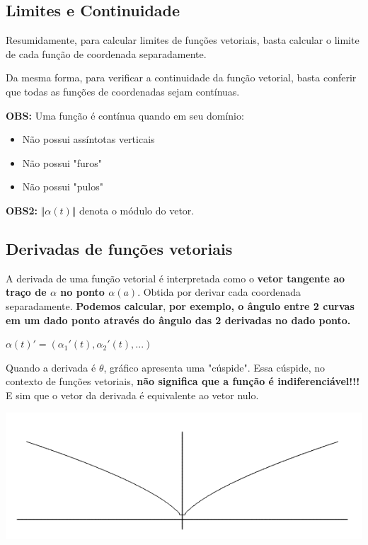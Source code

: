 \documentclass[letterpaper, 11pt]{article}
\begin{document}
\subsection{Limites e Continuidade}
\label{sec:org5e5866a}
Resumidamente, para calcular limites de funções vetoriais, basta calcular o limite de cada função de coordenada separadamente.

Da mesma forma, para verificar a continuidade da função vetorial, basta conferir que todas as funções de coordenadas sejam contínuas.

\textbf{OBS:} Uma função é contínua quando em seu domínio:
\begin{itemize}
\item Não possui assíntotas verticais
\item Não possui "furos"
\item Não possui "pulos"
\end{itemize}
\textbf{OBS2:} \(\Vert \alpha (t) \Vert\) denota o módulo do vetor.
\subsection{Derivadas de funções vetoriais}
\label{sec:org779d0a1}
A derivada de uma função vetorial é interpretada como o \textbf{vetor tangente ao traço de \(\alpha\) no ponto \(\alpha(a)\)}. Obtida por derivar cada coordenada separadamente. \textbf{Podemos calcular},
\textbf{por exemplo, o ângulo entre 2 curvas em um dado ponto através do ângulo das 2 derivadas no dado ponto.}

\begin{center} $\alpha(t)' = (\alpha_1'(t), \alpha_2'(t),...)$ \end{center}

Quando a derivada é \(\theta\), gráfico apresenta uma "cúspide". Essa cúspide, no contexto de funções vetoriais, \textbf{não significa que a função é indiferenciável!!!} E sim que o vetor da derivada é equivalente ao vetor nulo.
\begin{center}
\includegraphics[width=.9\linewidth]{./img/cuspide.png}
\end{center}
\end{document}
